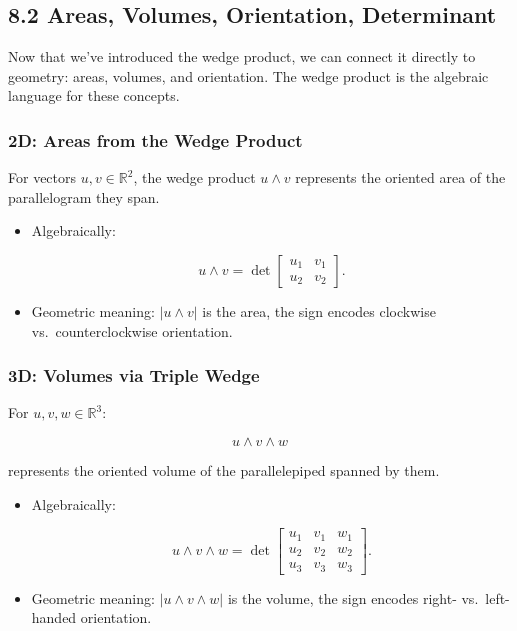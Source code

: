 \documentclass[
  letterpaper,
  DIV=11,
  numbers=noendperiod]{scrreprt}
\begin{document}
\subsection{8.2 Areas, Volumes, Orientation,
Determinant}\label{areas-volumes-orientation-determinant}

Now that we've introduced the wedge product, we can connect it directly
to geometry: areas, volumes, and orientation. The wedge product is the
algebraic language for these concepts.

\subsubsection{2D: Areas from the Wedge
Product}\label{d-areas-from-the-wedge-product}

For vectors \(u, v \in \mathbb{R}^2\), the wedge product \(u \wedge v\)
represents the oriented area of the parallelogram they span.

\begin{itemize}
\item
  Algebraically:

  \[
  u \wedge v = \det \begin{bmatrix} u_1 & v_1 \\ u_2 & v_2 \end{bmatrix}.
  \]
\item
  Geometric meaning: \(|u \wedge v|\) is the area, the sign encodes
  clockwise vs.~counterclockwise orientation.
\end{itemize}

\subsubsection{3D: Volumes via Triple
Wedge}\label{d-volumes-via-triple-wedge}

For \(u, v, w \in \mathbb{R}^3\):

\[
u \wedge v \wedge w
\]

represents the oriented volume of the parallelepiped spanned by them.

\begin{itemize}
\item
  Algebraically:

  \[
  u \wedge v \wedge w = \det \begin{bmatrix} u_1 & v_1 & w_1 \\ u_2 & v_2 & w_2 \\ u_3 & v_3 & w_3 \end{bmatrix}.
  \]
\item
  Geometric meaning: \(|u \wedge v \wedge w|\) is the volume, the sign
  encodes right- vs.~left-handed orientation.
\end{itemize}
\end{document}
